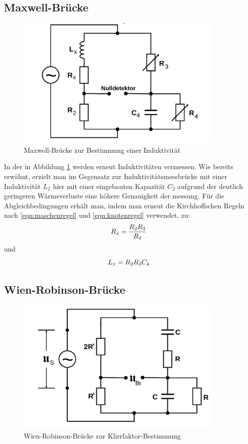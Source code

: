 \subsection{Maxwell-Brücke}
\begin{figure}
  \centering
  \includegraphics[width=0.9\textwidth]{Bilder/maxwell_bruecke.png}
  \caption{Maxwell-Brücke zur Bestimmung einer Induktivität \cite{Anleitung}}
  \label{fig:maxwellbrücke}
\end{figure}
In der in Abbildung \ref{fig:maxwellbrücke} werden erneut Induktivitäten vermessen.
Wie bereits erwähnt, erzielt man im Gegensatz zur Induktivitätsmessbrücke
mit einer Induktivität $L_2$ hier mit einer eingebauten Kapazität $C_2$ aufgrund der deutlich geringeren Wärmeverluste eine höhere Genauigkeit der messung.
Für die Abgleichbedingungen erhält man, indem man erneut die Kirchhoffschen Regeln nach \eqref{eqn:maschenregel} und \eqref{eqn:knotenregel} verwendet, zu:
\begin{equation}
\centering
R_x=\frac{R_2R_3}{R_4}
\end{equation}
und
\begin{equation}
\centering
\label{eqn:maxwellinduktivität}
L_x=R_2R_3C_4
\end{equation}
\subsection{Wien-Robinson-Brücke}
\begin{figure}
  \centering
  \includegraphics[width=0.9\textwidth]{Bilder/wien_robinson_bruecke.png}
  \caption{Wien-Robinson-Brücke zur Klirrfaktor-Bestimmung \cite{Anleitung}}
  \label{fig:wienrobinsonbrücke}
\end{figure}

